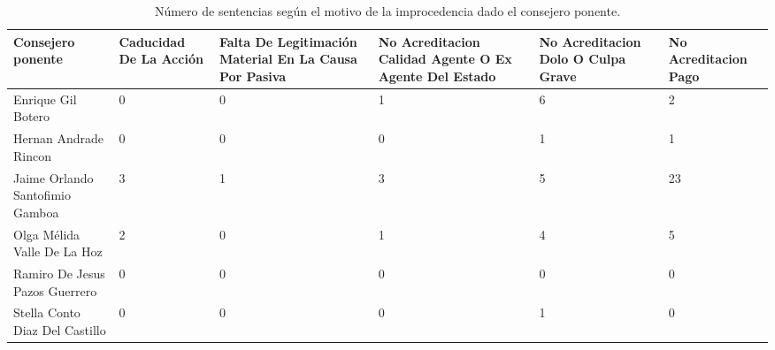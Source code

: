 \begin{table}[!htbp]
\centering
\caption{Número de sentencias según el motivo de la improcedencia dado el consejero ponente.} 
\label{tab:consejeroimpro}
\begin{tabular}{lR{3cm}R{3cm}R{3cm}R{3cm}R{3cm}}
  \hline
Consejero ponente & Caducidad De La Acción & Falta De Legitimación Material En La Causa Por Pasiva & No Acreditacion Calidad Agente O Ex Agente Del Estado & No Acreditacion Dolo O Culpa Grave & No Acreditacion Pago \\ 
  \hline
Enrique Gil Botero &  0 &  0 &  1 &  6 &  2 \\ 
  Hernan Andrade Rincon &  0 &  0 &  0 &  1 &  1 \\ 
  Jaime Orlando Santofimio Gamboa &  3 &  1 &  3 &  5 & 23 \\ 
  Olga Mélida Valle De La Hoz &  2 &  0 &  1 &  4 &  5 \\ 
  Ramiro De Jesus Pazos Guerrero &  0 &  0 &  0 &  0 &  0 \\ 
  Stella Conto Diaz Del Castillo &  0 &  0 &  0 &  1 &  0 \\ 
   \hline
\end{tabular}
\end{table}
